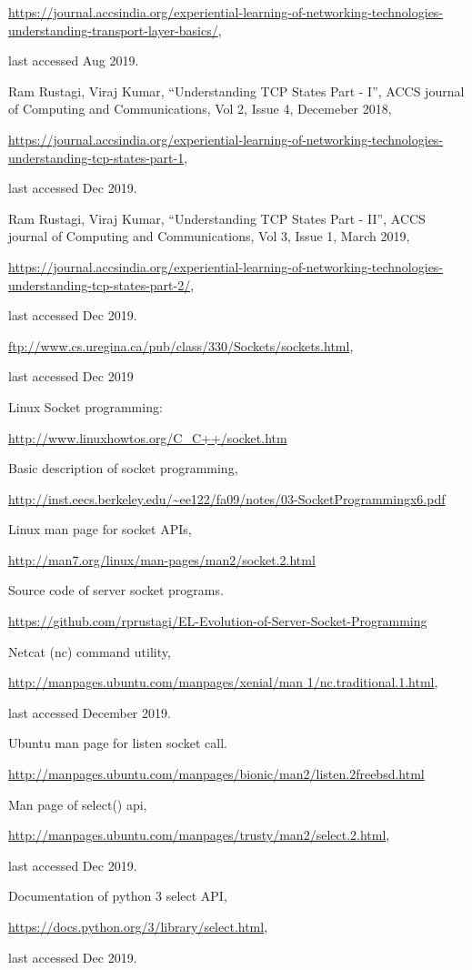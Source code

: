 \begin{multicols}{2}
\begin{thebibliography}{99}
 \url{https://journal.accsindia.org/experiential-learning-of-networking-technologies-understanding-transport-layer-basics/},
 
 last accessed Aug 2019.

 Ram Rustagi, Viraj Kumar, “Understanding TCP States Part - I”, ACCS journal of Computing and Communications, Vol 2, Issue 4, Decemeber 2018,

\url{https://journal.accsindia.org/experiential-learning-of-networking-technologies-understanding-tcp-states-part-1},

last accessed Dec 2019.

 Ram Rustagi, Viraj Kumar, “Understanding TCP States Part - II”, ACCS journal of Computing and Communications, Vol 3, Issue 1, March 2019,

\url{https://journal.accsindia.org/experiential-learning-of-networking-technologies-understanding-tcp-states-part-2/},

last accessed Dec 2019.

 \url{ftp://www.cs.uregina.ca/pub/class/330/Sockets/sockets.html},

last accessed Dec 2019

 Linux Socket programming:

\url{http://www.linuxhowtos.org/C_C++/socket.htm}

 Basic description of socket programming, 

\url{http://inst.eecs.berkeley.edu/~ee122/fa09/notes/03-SocketProgrammingx6.pdf}

 Linux man page for socket APIs,

\url{http://man7.org/linux/man-pages/man2/socket.2.html}

  Source code of server socket programs. 

\url{https://github.com/rprustagi/EL-Evolution-of-Server-Socket-Programming}

 Netcat (nc) command utility,

\url{http://manpages.ubuntu.com/manpages/xenial/man 1/nc.traditional.1.html},

last accessed December 2019.

 Ubuntu man page for listen socket call. 

\url{http://manpages.ubuntu.com/manpages/bionic/man2/listen.2freebsd.html}

 Man page of select() api,

\url{http://manpages.ubuntu.com/manpages/trusty/man2/select.2.html},

last accessed Dec 2019.

 Documentation of python 3 select API,

\url{https://docs.python.org/3/library/select.html},

last accessed Dec 2019.
\end{thebibliography}
\end{multicols}

